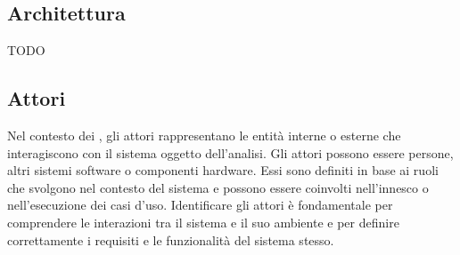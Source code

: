 \vspace{2em}
\subsection*{Architettura}
TODO

\vspace{2em}
\subsection*{Attori}
Nel contesto dei , gli attori rappresentano le entità interne o esterne che interagiscono con il sistema oggetto dell'analisi. Gli attori possono essere persone, altri sistemi software o componenti hardware. Essi sono definiti in base ai ruoli che svolgono nel contesto del sistema e possono essere coinvolti nell'innesco o nell'esecuzione dei casi d'uso. Identificare gli attori è fondamentale per comprendere le interazioni tra il sistema e il suo ambiente e per definire correttamente i requisiti e le funzionalità del sistema stesso.
